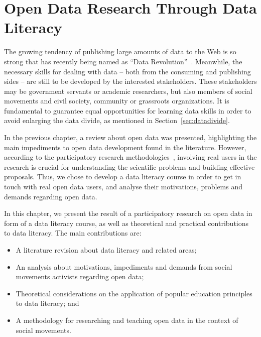 
\chapter{Open Data Research Through Data Literacy}
\label{chap:dataliteracy}

The growing tendency of publishing large amounts of data to the Web is so strong that has recently being named as ``Data Revolution''~\cite{DataRevolutionGroup2014}.
Meanwhile, the necessary skills for dealing with data -- both from the consuming and publishing sides -- are still to be developed by the interested stakeholders.
These stakeholders may be government servants or academic researchers, but also members of social movements and civil society, community or grassroots organizations.
It is fundamental to guarantee equal opportunities for learning data skills in order to avoid enlarging the data divide, as mentioned in Section~\ref{sec:datadivide}.

In the previous chapter, a review about open data was presented, highlighting the main impediments to open data development found in the literature.
However, according to the participatory research methodologies~\cite{SCHULER1993,FalsBorda1991,Alvear2014}, involving real users in the research is crucial for understanding the scientific problems and building effective proposals.
Thus, we chose to develop a data literacy course in order to get in touch with real open data users, and analyse their motivations, problems and demands regarding open data.

In this chapter, we present the result of a participatory research on open data in form of a data literacy course, as well as theoretical and practical contributions to data literacy. 
The main contributions are:

\begin{itemize}
	\item A literature revision about data literacy and related areas;
	\item An analysis about motivations, impediments and demands from social movements activists regarding open data;
	\item Theoretical considerations on the application of popular education principles to data literacy; and
	\item A methodology for researching and teaching open data in the context of social movements.
\end{itemize}

